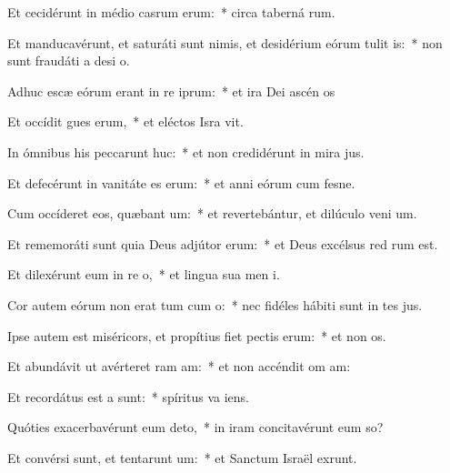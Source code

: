 \item Et cecidérunt in médio casrum erum:~* circa taberná rum.
\item Et manducavérunt, et saturáti sunt nimis, et desidérium eórum tulit is:~* non sunt fraudáti a desi o.
\item Adhuc escæ eórum erant in re iprum:~* et ira Dei ascén  os
\item Et occídit gues erum,~* et eléctos Isra vit.
\item In ómnibus his peccarunt huc:~* et non credidérunt in mira jus.
\item Et defecérunt in vanitáte es erum:~* et anni eórum cum fesne.
\item Cum occíderet eos, quæbant um:~* et revertebántur, et dilúculo veni  um.
\item Et rememoráti sunt quia Deus adjútor  erum:~* et Deus excélsus red rum est.
\item Et dilexérunt eum in re o,~* et lingua sua men  i.
\item Cor autem eórum non erat tum cum o:~* nec fidéles hábiti sunt in tes jus.
\item Ipse autem est miséricors, et propítius fiet pectis erum:~* et non  os.
\item Et abundávit ut avérteret ram am:~* et non accéndit om  am:
\item Et recordátus est a  sunt:~* spíritus va   iens.
\item Quóties exacerbavérunt eum  deto,~* in iram concitavérunt eum  so?
\item Et convérsi sunt, et tentarunt um:~* et Sanctum Israël exrunt.

